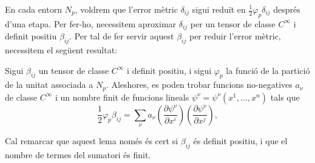 En cada entorn $N_p$, voldrem que l'error mètric $\delta_{ij}$ sigui reduït en $\frac12\varphi_p\delta_{ij}$ després d'una etapa. Per fer-ho, necessitem aproximar $\delta_{ij}$ per un tensor de classe $C^\infty$ i definit positiu $\beta_{ij}$. Per tal de fer servir aquest $\beta_{ij}$ per reduir l'error mètric, necessitem el següent resultat:
\begin{lema}
    Sigui $\beta_{ij}$ un tensor de classe $C^\infty$ i definit positiu, i sigui $\varphi_p$ la funció de la partició de la unitat associada a $N_p$. Aleshores, es poden trobar funcions no-negatives $a_\nu$ de classe $C^\infty$ i un nombre finit de funcions lineals $\psi^\nu = \psi^\nu(x^1, \dots, x^n)$ tals que
\begin{equation}\label{eq:lema_descomp}
    \frac12\varphi_p\beta_{ij} = \sum_\nu a_\nu \left(\frac{\partial\psi^\nu}{\partial x^i}\right)\left(\frac{\partial\psi^\nu}{\partial x^j}\right),
\end{equation}
\end{lema}
\begin{obs}
    Cal remarcar que aquest lema només és cert si $\beta_{ij}$ és definit positiu, i que el nombre de termes del sumatori és finit.
\end{obs}
